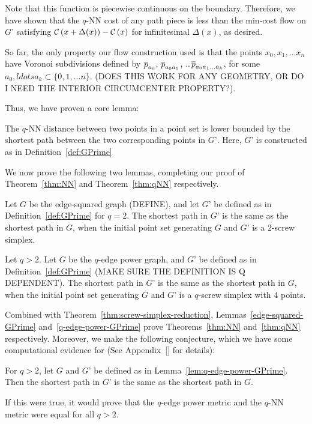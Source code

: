 Note that this function is piecewise continuous on the boundary. Therefore,
we have shown that the $q$-NN cost of any path piece is less than the
min-cost flow on $G’$ satisfying
$\mathcal{C}\left(x+\Delta(x)\right)-\mathcal{C}\left(x\right)$ for infinitesimal
$\Delta(x)$, as desired.

So far, the only property our flow construction used is that the points
$x_0, x_1, \ldots x_n$ have Voronoi subdivisions defined by $\overline{p}_{a_0}$,
$\overline{p}_{a_0a_1}$, \ldots $\overline{p}_{a_0a_1\ldots a_k}$, for some $a_0, ldots a_k
\subset \{0, 1, \ldots n\}$. (DOES THIS WORK FOR ANY GEOMETRY, OR DO I NEED
THE INTERIOR CIRCUMCENTER PROPERTY?).

Thus, we have proven a core lemma:

\begin{lemma}\label{lem:qNN-GPrime}

The $q$-NN distance between two points in a point set is lower bounded by
the shortest path between the two corresponding points in $G’$. Here, $G’$
is constructed as in Definition~\ref{def:GPrime}

\end{lemma}

We now prove the following two lemmas, completing our proof of
Theorem~\ref{thm:NN} and Theorem~\ref{thm:qNN} respectively.

\begin{lemma}\label{lem:edge-squared-GPrime} Let $G$ be the edge-squared graph
(DEFINE), and let $G’$ be defined as in Definition~\ref{def:GPrime} for $q=2$.
The shortest path in $G’$ is the same as the shortest path in $G$, when the
initial point set generating $G$ and $G’$ is a $2$-screw simplex.

\end{lemma}

\begin{lemma}\label{lem:q-edge-power-GPrime} Let $q > 2$. Let $G$ be the
$q$-edge power graph, and $G’$ be defined as in Definition~\ref{def:GPrime}
(MAKE SURE THE DEFINITION IS Q DEPENDENT). The shortest path in $G’$ is the
same as the shortest path in $G$, when the initial point set generating $G$
and $G’$ is a $q$-screw simplex with $4$ points.

\end{lemma}

Combined with Theorem~\ref{thm:screw-simplex-reduction},
Lemmas~\ref{edge-squared-GPrime} and~\ref{q-edge-power-GPrime} prove
Theorems~\ref{thm:NN} and~\ref{thm:qNN} respectively. Moreover, we make the
following conjecture, which we have some computational evidence for (See
Appendix~\ref{} for details):

\begin{conjecture}\label{conj:qNN}

For $q>2$, let $G$ and $G’$ be defined as in
Lemma~\ref{lem:q-edge-power-GPrime}. Then the shortest path in $G’$ is the same
as the shortest path in $G$.

\end{conjecture}

If this were true, it would prove that the $q$-edge power metric and the
$q$-NN metric were equal for all $q>2$.
